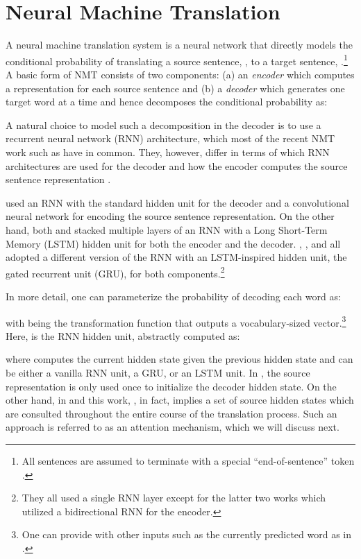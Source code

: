 \documentclass[11pt,a4paper]{article}
\begin{document}
\section{Neural Machine Translation}
\label{sec:nmt}
A neural machine translation system is a neural network that directly models the conditional probability  of translating
a source sentence, , to a target sentence, .\footnote{All sentences are assumed to terminate with a special ``end-of-sentence'' token \eos{}.}
A basic form of NMT consists of two components: (a) an {\it encoder} which computes a representation  for each source sentence  and (b) a {\it decoder} which generates one target word at a time and hence decomposes the conditional probability as:


A natural choice to model such a decomposition in the decoder is to use a recurrent neural network (RNN) architecture, which most of the recent NMT work such as \cite{kal13,sutskever14,cho14,bog15,luong15,jean15} have in common. They, however, differ in terms of which RNN architectures are used for the decoder and how the encoder computes the source sentence representation .

 used an RNN with the standard hidden unit for the decoder and a
convolutional neural network for encoding the source sentence representation. On
the other hand, both  and  stacked
multiple layers of an RNN with a Long Short-Term Memory (LSTM) hidden unit for
both the encoder and the decoder. , , and
 all adopted a different version of the RNN with an
LSTM-inspired hidden unit, the gated recurrent unit (GRU), for both
components.\footnote{They all used a single RNN layer except for the latter two
works which utilized a bidirectional RNN for the encoder.}

In more detail, one can parameterize the probability of decoding each word  as:

with  being the transformation function that outputs a vocabulary-sized
vector.\footnote{One can provide  with other inputs such as the currently
predicted word  as in \cite{bog15}.} Here,  is the RNN hidden
unit, abstractly computed as:

where  computes the current hidden state given the previous hidden state and
can be either a vanilla RNN unit, a GRU, or an LSTM unit. In \cite{kal13,sutskever14,cho14,luong15}, the source representation  is only used once to initialize the decoder hidden state. On the other hand, in \cite{bog15,jean15} and this work, , in fact, implies a set of source hidden states which are consulted throughout the entire course of the translation process. Such an approach is referred to as an attention mechanism, which we will discuss next.
\end{document}
